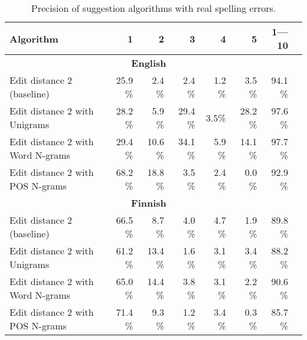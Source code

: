 \documentclass{llncs}
\begin{document}
\begin{table*}
    \caption{Precision of suggestion algorithms with real spelling errors.
    \label{table:real-eval}}
  \begin{center}
      \begin{tabular}{lrrrrrrr}
        \hline
        Algorithm & 1 & 2 & 3 & 4 & 5 & 1---10 \\
        \hline
        \multicolumn{7}{c}{\textbf{English}} \\
        \hline
        Edit distance 2 (baseline) 
& 25.9 \% & 2.4 \% & 2.4 \% & 1.2 \% & 3.5 \% & 94.1 \% \\
        \hline
        Edit distance 2 with Unigrams 
& 28.2 \% & 5.9 \% & 29.4 \% & 3.5\% & 28.2 \% & 97.6 \% \\
        \hline
        Edit distance 2 with Word N-grams 
& 29.4 \% & 10.6 \% & 34.1 \% & 5.9 \% & 14.1 \% & 97.7 \% \\
        \hline
        Edit distance 2 with POS N-grams 
& 68.2 \% & 18.8 \% & 3.5 \% & 2.4 \% & 0.0 \% & 92.9 \% \\
\hline
        \multicolumn{7}{c}{\textbf{Finnish}} \\
        \hline
        Edit distance 2 (baseline)
& 66.5 \% & 8.7 \% & 4.0 \% & 4.7 \% & 1.9 \% & 89.8 \% \\
        \hline
        Edit distance 2 with Unigrams 
& 61.2 \% & 13.4 \% & 1.6 \% & 3.1 \% & 3.4 \% & 88.2 \% \\
        \hline
        Edit distance 2 with Word N-grams
& 65.0 \% & 14.4 \% & 3.8 \% & 3.1 \% & 2.2 \% & 90.6 \% \\
        \hline
        Edit distance 2 with POS N-grams
& 71.4 \% & 9.3 \% & 1.2 \% & 3.4 \% & 0.3 \% & 85.7 \% \\
        \hline
      \end{tabular}
  \end{center}
\end{table*}
\end{document}
